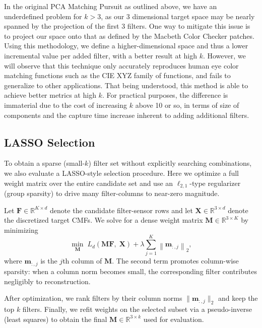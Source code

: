 In the original PCA Matching Pursuit as outlined above, we have an underdefined problem for $k>3$, as our 3 dimensional target space may be nearly spanned by the projection of the first 3 filters. 
One way to mitigate this issue is to project our space onto that as defined by the Macbeth Color Checker patches. 
Using this methodology, we define a higher-dimensional space and thus a lower incremental value per added filter, with a better result at high $k$. 
However, we will observe that this technique only accurately reproduces human eye color matching functions such as the CIE XYZ family of functions, and fails to generalize to other applications. 
That being understood, this method is able to achieve better metrics at high $k$. 
For practical purposes, the difference is immaterial due to the cost of increasing $k$ above 10 or so, in terms of size of components and the capture time increase inherent to adding additional filters. 

\subsection{LASSO Selection}
To obtain a sparse (small-$k$) filter set without explicitly searching combinations, we also evaluate a LASSO-style selection procedure. Here we optimize a full weight matrix over the entire candidate set and use an $\ell_{2,1}$-type regularizer (group sparsity) to drive many filter-columns to near-zero magnitude.

Let $\mathbf{F}\in\mathbb{R}^{K\times d}$ denote the candidate filter-sensor rows and let $\mathbf{X}\in\mathbb{R}^{3\times d}$ denote the discretized target CMFs. We solve for a dense weight matrix $\boldsymbol{M}\in\mathbb{R}^{3\times K}$ by minimizing
\begin{equation}
    \min_{\boldsymbol{M}} \; L_d\!\left(\boldsymbol{M}\mathbf{F},\;\mathbf{X}\right) + \lambda \sum_{j=1}^{K}\left\|\boldsymbol{m}_{:,j}\right\|_2,
    \label{eq:lasso-group}
\end{equation}
where $\boldsymbol{m}_{:,j}$ is the $j$th column of $\boldsymbol{M}$. The second term promotes column-wise sparsity: when a column norm becomes small, the corresponding filter contributes negligibly to reconstruction.

After optimization, we rank filters by their column norms $\|\boldsymbol{m}_{:,j}\|_2$ and keep the top $k$ filters. Finally, we refit weights on the selected subset via a pseudo-inverse (least squares) to obtain the final $\boldsymbol{M}\in\mathbb{R}^{3\times k}$ used for evaluation.

